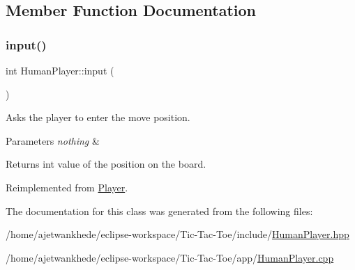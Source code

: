 \subsection{Member Function Documentation}
\mbox{\label{classHumanPlayer_a8281fe260b25edc4451fd15ae182707f}} 
\subsubsection{\texorpdfstring{input()}{input()}}
{\footnotesize\ttfamily int Human\+Player\+::input (\begin{DoxyParamCaption}{ }\end{DoxyParamCaption})\hspace{0.3cm}{\ttfamily [virtual]}}



Asks the player to enter the move position. 


\begin{DoxyParams}{Parameters}
{\em nothing} & \\
\hline
\end{DoxyParams}
\begin{DoxyReturn}{Returns}
int value of the position on the board. 
\end{DoxyReturn}


Reimplemented from \mbox{\hyperlink{classPlayer_a3e7c5ce7c59c8b5cc9d0b985a1baae91}{Player}}.



The documentation for this class was generated from the following files\+:\begin{DoxyCompactItemize}
\item 
/home/ajetwankhede/eclipse-\/workspace/\+Tic-\/\+Tac-\/\+Toe/include/\mbox{\hyperlink{HumanPlayer_8hpp}{Human\+Player.\+hpp}}\item 
/home/ajetwankhede/eclipse-\/workspace/\+Tic-\/\+Tac-\/\+Toe/app/\mbox{\hyperlink{HumanPlayer_8cpp}{Human\+Player.\+cpp}}\end{DoxyCompactItemize}
